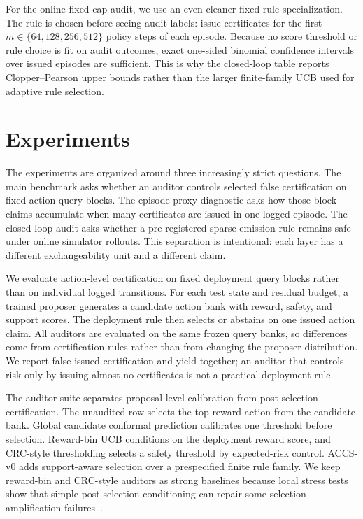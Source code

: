\documentclass[letterpaper]{article}
\begin{document}
For the online fixed-cap audit, we use an even cleaner fixed-rule specialization.
The rule is chosen before seeing audit labels: issue certificates for the first
$m\in\{64,128,256,512\}$ policy steps of each episode. Because no score
threshold or rule choice is fit on audit outcomes, exact one-sided binomial
confidence intervals over issued episodes are sufficient. This is why the
closed-loop table reports Clopper--Pearson upper bounds rather than the larger
finite-family UCB used for adaptive rule selection.

\section{Experiments}

The experiments are organized around three increasingly strict questions. The
main benchmark asks whether an auditor controls selected false certification on
fixed action query blocks. The episode-proxy diagnostic asks how those block
claims accumulate when many certificates are issued in one logged episode. The
closed-loop audit asks whether a pre-registered sparse emission rule remains
safe under online simulator rollouts. This separation is intentional: each
layer has a different exchangeability unit and a different claim.

We evaluate action-level certification on fixed deployment query blocks rather
than on individual logged transitions. For each test state and residual budget,
a trained proposer generates a candidate action bank with reward, safety, and
support scores. The deployment rule then selects or abstains on one issued
action claim. All auditors are evaluated on the same frozen query banks, so
differences come from certification rules rather than from changing the
proposer distribution. We report false issued certification and yield together;
an auditor that controls risk only by issuing almost no certificates is not a
practical deployment rule.

The auditor suite separates proposal-level calibration from post-selection
certification. The unaudited row selects the top-reward action from the
candidate bank. Global candidate conformal prediction calibrates one threshold
before selection. Reward-bin UCB conditions on the deployment reward score, and
CRC-style thresholding selects a safety threshold by expected-risk control.
ACCS-v0 adds support-aware selection over a prespecified finite rule family.
We keep reward-bin and CRC-style auditors as strong baselines because local
stress tests show that simple post-selection conditioning can repair some
selection-amplification failures~\cite{angelopoulos2025crc}.
\end{document}
